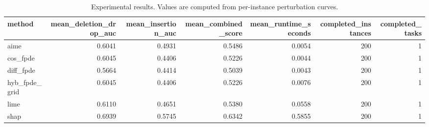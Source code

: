 \begin{table}[t]
\caption{Experimental results. Values are computed from per-instance perturbation curves.}
\label{tab:main_results_computed}
\centering
\begin{tabular}{lrrrrrr}
\toprule
method & mean\_deletion\_drop\_auc & mean\_insertion\_auc & mean\_combined\_score & mean\_runtime\_seconds & completed\_instances & completed\_tasks \\
\midrule
aime & 0.6041 & 0.4931 & 0.5486 & 0.0054 & 200 & 1 \\
cos\_fpde & 0.6045 & 0.4406 & 0.5226 & 0.0044 & 200 & 1 \\
diff\_fpde & 0.5664 & 0.4414 & 0.5039 & 0.0043 & 200 & 1 \\
hyb\_fpde\_grid & 0.6045 & 0.4406 & 0.5226 & 0.0076 & 200 & 1 \\
lime & 0.6110 & 0.4651 & 0.5380 & 0.0558 & 200 & 1 \\
shap & 0.6939 & 0.5745 & 0.6342 & 0.5855 & 200 & 1 \\
\bottomrule
\end{tabular}

\end{table}
